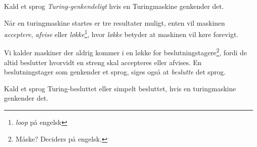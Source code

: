 \begin{definition}
Kald et sprog \textit{Turing-genkendeligt} hvis en Turingmaskine genkender det.
\end{definition}

Når en turingmaskine startes er tre resultater muligt, enten vil maskinen \textit{acceptere}, \textit{afvise} eller \textit{løkke}\footnote{\textit{loop} på engelsk}, hvor \textit{løkke} betyder at maskinen vil køre forevigt.

Vi kalder maskiner der aldrig kommer i en løkke for beslutningstagere\footnote{Måske? Deciders på engelsk.}, fordi de altid beslutter hvorvidt en streng skal accepteres eller afvises. En beslutningstager som genkender et sprog, siges også at \textit{beslutte} det sprog.

\begin{definition}
Kald et sprog Turing-besluttet eller simpelt besluttet, hvis en turingmaskine genkender det.
\end{definition}

